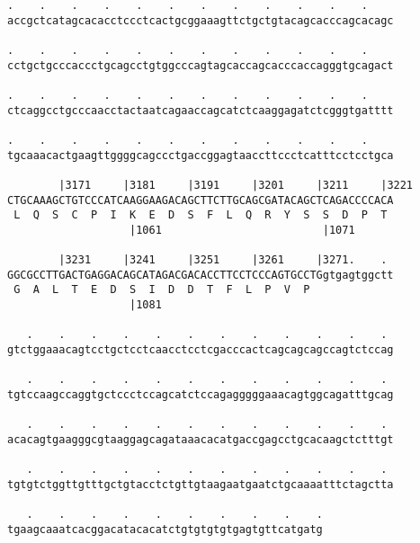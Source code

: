 \documentclass{article}
\begin{document}
\begin{Verbatim}
.    .    .    .    .    .    .    .    .    .    .    .    
accgctcatagcacacctccctcactgcggaaagttctgctgtacagcacccagcacagc
                                                            
.    .    .    .    .    .    .    .    .    .    .    .    
cctgctgcccaccctgcagcctgtggcccagtagcaccagcacccaccagggtgcagact
                                                            
.    .    .    .    .    .    .    .    .    .    .    .    
ctcaggcctgcccaacctactaatcagaaccagcatctcaaggagatctcgggtgatttt
                                                            
.    .    .    .    .    .    .    .    .    .    .    .    
tgcaaacactgaagttggggcagccctgaccggagtaaccttccctcatttcctcctgca
                                                            
        |3171     |3181     |3191     |3201     |3211     |3221
CTGCAAAGCTGTCCCATCAAGGAAGACAGCTTCTTGCAGCGATACAGCTCAGACCCCACA
 L  Q  S  C  P  I  K  E  D  S  F  L  Q  R  Y  S  S  D  P  T 
                   |1061                         |1071      
  
        |3231     |3241     |3251     |3261     |3271.    . 
GGCGCCTTGACTGAGGACAGCATAGACGACACCTTCCTCCCAGTGCCTGgtgagtggctt
 G  A  L  T  E  D  S  I  D  D  T  F  L  P  V  P             
                   |1081                                    
  
   .    .    .    .    .    .    .    .    .    .    .    . 
gtctggaaacagtcctgctcctcaacctcctcgacccactcagcagcagccagtctccag
                                                            
   .    .    .    .    .    .    .    .    .    .    .    . 
tgtccaagccaggtgctccctccagcatctccagagggggaaacagtggcagatttgcag
                                                            
   .    .    .    .    .    .    .    .    .    .    .    . 
acacagtgaagggcgtaaggagcagataaacacatgaccgagcctgcacaagctctttgt
                                                            
   .    .    .    .    .    .    .    .    .    .    .    . 
tgtgtctggttgtttgctgtacctctgttgtaagaatgaatctgcaaaatttctagctta
                                                            
   .    .    .    .    .    .    .    .    .    .
tgaagcaaatcacggacatacacatctgtgtgtgtgagtgttcatgatg
                                                 
                                                 
 

\end{Verbatim}
\end{document}
